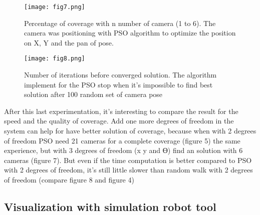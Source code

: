\begin{figure}
  \centering
  \hspace*{\fill}
	{\texttt{[image: fig7.png]}}
  \hspace*{\fill}
  \caption{%
	Percentage of coverage with n number of camera (1 to 6). The camera was positioning with PSO algorithm to optimize the position on X, Y and the pan of pose.}
  \label{fig:4}
\end{figure}
\begin{figure}
  \centering
  \hspace*{\fill}
	{\texttt{[image: fig8.png]}}
  \hspace*{\fill}
  \caption{%
	Number of iterations before converged solution.  The algorithm implement for the PSO stop when it’s impossible to find best solution after 100 random set of camera pose}
  \label{fig:4}
\end{figure} 
After this last experimentation, it’s interesting to compare the result for the speed and the quality of coverage.
	Add one more degrees of freedom in the system can help for have better solution of coverage, because when with 2 degrees of freedom PSO need 21 cameras for a complete coverage (figure 5) the same experience, but with 3 degrees of freedom (x y and Ɵ) find an solution with 6 cameras (figure 7).
But even if the time computation is better compared to PSO with 2 degrees of freedom, it’s still little slower than random walk with 2 degrees of freedom  (compare figure 8 and  figure 4) 



\subsection{Visualization with simulation robot tool }\label{subsec:42}


